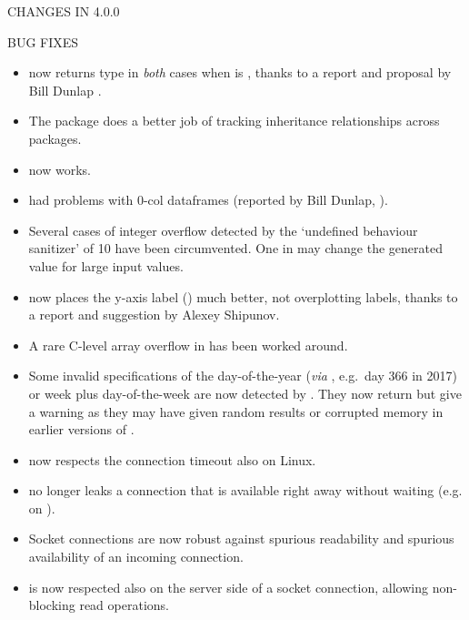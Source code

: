 \documentclass[letterpaper]{book}
\begin{document}
\begin{Section}{ CHANGES IN 4.0.0}
\begin{SubSection}{BUG FIXES}
\begin{itemize}
\item{}  now returns  type in
\emph{both} cases when  is , thanks to a
report and proposal by Bill Dunlap .

\item{} The  package does a better job of tracking
inheritance relationships across packages.

\item{}  now works.

\item{}  had problems with 0-col dataframes (reported
by Bill Dunlap, ).

\item{} Several cases of integer overflow detected by the
`undefined behaviour sanitizer' of  10 have
been circumvented.  One in  may change the
generated value for large input values.

\item{}  now places the y-axis label ()
much better, not overplotting labels, thanks to a report and
suggestion by Alexey Shipunov.


\item{} A rare C-level array overflow in  has been
worked around.

\item{} Some invalid specifications of the day-of-the-year
(\emph{via} , e.g.~day 366 in 2017) or week
plus day-of-the-week are now detected by .
They now return  but give a warning as they may have
given random results or corrupted memory in earlier versions of \R{}.

\item{}  now respects the
connection timeout also on Linux.

\item{}  no longer leaks a
connection that is available right away without waiting (e.g. on
).

\item{} Socket connections are now robust against spurious readability
and spurious availability of an incoming connection.

\item{}  is now respected also on the server side
of a socket connection, allowing non-blocking read operations.


\end{itemize}
\end{SubSection}
\end{Section}
\end{document}
